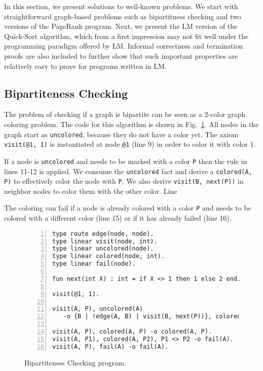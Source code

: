 In this section, we present solutions to well-known problems. We start with
straightforward graph-based problems such as bipartitness checking and two
versions of the PageRank program. Next, we present the LM version of the
Quick-Sort algorithm, which from a first impression may not fit well under the
programming paradigm offered by LM. Informal correctness and termination proofs
are also included to further show that such important properties are relatively
easy to prove for programs written in LM.

\subsection{Bipartiteness Checking}

The problem of checking if a graph is bipartite can be seen as a 2-color graph
coloring problem.  The code for this algorithm is shown in
Fig.~\ref{language:code:bichecking}. All nodes in the graph start as
\texttt{uncolored},
because they do not have a color yet. The axiom \texttt{visit(@1, 1)} is
instantiated at node \texttt{@1} (line 9) in order to color it with color 1.

If a node is \texttt{uncolored} and needs to be marked with a color \texttt{P}
then the rule in lines 11-12 is applied. We consume the \texttt{uncolored} fact
and derive a \texttt{colored(A, P)} to effectively color the node with
\texttt{P}. We also derive \texttt{visit(B, next(P))} in neighbor nodes to color
them with the other color. Line 

The coloring can fail if a node is already colored with a color \texttt{P} and
needs to be colored with a different color (line 15) or if it has already failed
(line 16).

\begin{figure}[h!]
\begin{Verbatim}[numbers=left,fontsize=\scriptsize]
type route edge(node, node).
type linear visit(node, int).
type linear uncolored(node).
type linear colored(node, int).
type linear fail(node).

fun next(int X) : int = if X <> 1 then 1 else 2 end.

visit(@1, 1).

visit(A, P), uncolored(A)
   -o {B | !edge(A, B) | visit(B, next(P))}, colored(A, P).

visit(A, P), colored(A, P) -o colored(A, P).
visit(A, P1), colored(A, P2), P1 <> P2 -o fail(A).
visit(A, P), fail(A) -o fail(A).
\end{Verbatim}
  \caption{Bipartiteness Checking program.}
  \label{language:code:bichecking}
\end{figure}

